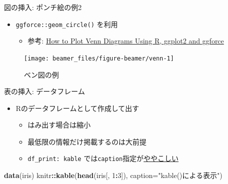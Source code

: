 \documentclass[
  12pt,
  ignorenonframetext,
]{beamer}
\newenvironment{Shaded}{\begin{snugshade}}{\end{snugshade}}
\newcommand{\DataTypeTok}[1]{\textcolor[rgb]{0.13,0.29,0.53}{#1}}
\newcommand{\DecValTok}[1]{\textcolor[rgb]{0.00,0.00,0.81}{#1}}
\newcommand{\KeywordTok}[1]{\textcolor[rgb]{0.13,0.29,0.53}{\textbf{#1}}}
\newcommand{\NormalTok}[1]{#1}
\newcommand{\OperatorTok}[1]{\textcolor[rgb]{0.81,0.36,0.00}{\textbf{#1}}}
\newcommand{\StringTok}[1]{\textcolor[rgb]{0.31,0.60,0.02}{#1}}
\providecommand{\tightlist}{%
  \setlength{\itemsep}{0pt}\setlength{\parskip}{0pt}}
\begin{document}
\begin{frame}[fragile]{図の挿入: ポンチ絵の例2}
\protect\hypertarget{ux56f3ux306eux633fux5165-ux30ddux30f3ux30c1ux7d75ux306eux4f8b2}{}

\begin{itemize}
\tightlist
\item
  \texttt{ggforce::geom\_circle()} を利用

  \begin{itemize}
  \tightlist
  \item
    参考:
    \href{https://scriptsandstatistics.wordpress.com/2018/04/26/how-to-plot-venn-diagrams-using-r-ggplot2-and-ggforce/}{How
    to Plot Venn Diagrams Using R, ggplot2 and ggforce}
  \end{itemize}
\end{itemize}

\begin{figure}

{\centering \texttt{[image: beamer\_files/figure-beamer/venn-1]} 

}

\caption{ベン図の例}\label{fig:venn}
\end{figure}

\end{frame}

\begin{frame}[fragile]{表の挿入: データフレーム}
\protect\hypertarget{ux8868ux306eux633fux5165-ux30c7ux30fcux30bfux30d5ux30ecux30fcux30e0}{}

\begin{itemize}
\tightlist
\item
  Rのデータフレームとして作成して出す

  \begin{itemize}
  \tightlist
  \item
    はみ出す場合は縮小
  \item
    最低限の情報だけ掲載するのは大前提
  \item
    \texttt{df\_print:\ kable}
    では\texttt{caption}指定が\href{https://stackoverflow.com/questions/48410861/how-to-add-table-caption-using-df-print}{ややこしい}
  \end{itemize}
\end{itemize}

\begin{Shaded}
\begin{Highlighting}[]
\KeywordTok{data}\NormalTok{(iris)}
\NormalTok{knitr}\OperatorTok{::}\KeywordTok{kable}\NormalTok{(}\KeywordTok{head}\NormalTok{(iris[, }\DecValTok{1}\OperatorTok{:}\DecValTok{3}\NormalTok{]),}
             \DataTypeTok{caption=}\StringTok{"kable()による表示"}\NormalTok{)}
\end{Highlighting}
\end{Shaded}

\end{frame}
\end{document}
